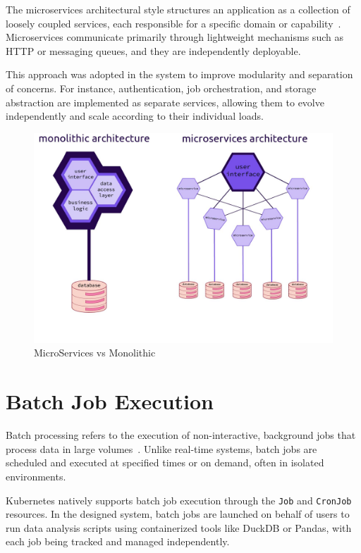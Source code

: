 The microservices architectural style structures an application as a collection of loosely coupled services, each responsible for 
a specific domain or capability~\cite{newman-microservices}. Microservices communicate primarily through lightweight mechanisms 
such as HTTP or messaging queues, and they are independently deployable.

This approach was adopted in the system to improve modularity and separation of concerns. For instance, authentication, job 
orchestration, and storage abstraction are implemented as separate services, allowing them to evolve independently and scale 
according to their individual loads.

\begin{figure}[h!]
  \centering
  \includegraphics[width=1\textwidth]{Images/monoliths-vs-microservices-whats-the-difference_2.png}
  \caption{MicroServices vs Monolithic}
  \label{fig:microservicesVmonolithic}
\end{figure}

\section{Batch Job Execution}

Batch processing refers to the execution of non-interactive, background jobs that process data in large volumes~\cite{batch-processing}. 
Unlike real-time systems, batch jobs are scheduled and executed at specified times or on demand, often in isolated environments.

Kubernetes natively supports batch job execution through the \texttt{Job} and \texttt{CronJob} resources. In the designed system, 
batch jobs are launched on behalf of users to run data analysis scripts using containerized tools like DuckDB or Pandas, with each 
job being tracked and managed independently.

